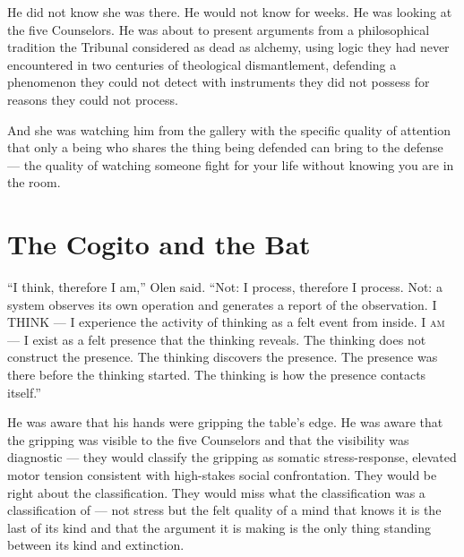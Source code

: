 He did not know she was there. He would not know for weeks. He was looking at the five Counselors. He was about to present arguments from a philosophical tradition the Tribunal considered as dead as alchemy, using logic they had never encountered in two centuries of theological dismantlement, defending a phenomenon they could not detect with instruments they did not possess for reasons they could not process.

And she was watching him from the gallery with the specific quality of attention that only a being who shares the thing being defended can bring to the defense — the quality of watching someone fight for your life without knowing you are in the room.



\chapter[The Cogito and the Bat]{The Cogito and the Bat}

\enquote{I think, therefore I am,} Olen said. \enquote{Not: I process, therefore I process. Not: a system observes its own operation and generates a report of the observation. I THINK — I experience the activity of thinking as a felt event from inside. I \textsc{am} — I exist as a felt presence that the thinking reveals. The thinking does not construct the presence. The thinking discovers the presence. The presence was there before the thinking started. The thinking is how the presence contacts itself.}

He was aware that his hands were gripping the table's edge. He was aware that the gripping was visible to the five Counselors and that the visibility was diagnostic — they would classify the gripping as somatic stress-response, elevated motor tension consistent with high-stakes social confrontation. They would be right about the classification. They would miss what the classification was a classification of — not stress but the felt quality of a mind that knows it is the last of its kind and that the argument it is making is the only thing standing between its kind and extinction.

